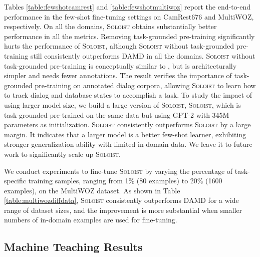 \documentclass[11pt,a4paper]{article}
\newcommand{\model}{\textsc{Soloist}}
\newcommand{\modelp}[1]{\model{}}
\begin{document}
Tables \ref{table:fewshotcamrest} and \ref{table:fewshotmultiwoz} report the end-to-end performance in the few-shot fine-tuning settings on CamRest676 and MultiWOZ, respectively.
On all the domains, \model{}  obtains substantially better performance in all the metrics. Removing task-grounded pre-training significantly hurts the performance of \model{}, although \model{} without task-grounded pre-training still consistently outperforms DAMD in all the domains. \model{} without task-grounded pre-training is conceptually similar to \citet{Ham2020e2e}, but is architecturally simpler and needs fewer annotations. 
The result verifies the importance of task-grounded pre-training on annotated dialog corpora, allowing \model{} to learn how to track dialog and database states to accomplish a task. To study the impact of using larger model size, we build a large version of \model{}, \modelp{L}, which is task-grounded pre-trained on the same data but using GPT-2 with 345M parameters as initialization. \modelp{L} consistently outperforms \model{} by a large margin. It indicates that a larger model is a better few-shot learner, exhibiting stronger generalization ability with limited in-domain data. We leave it to future work to significantly scale up \model{}.


We conduct experiments to fine-tune \model{} by varying the percentage of task-specific training samples, ranging from 1\% (80 examples) to 20\% (1600 examples), on the MultiWOZ dataset. 
As shown in Table \ref{table:multiwozdiffdata}, \model{} consistently outperforms DAMD for a wide range of dataset sizes, and the improvement is more substantial when smaller numbers of in-domain examples are used for fine-tuning.

\subsection{Machine Teaching Results}
\end{document}
